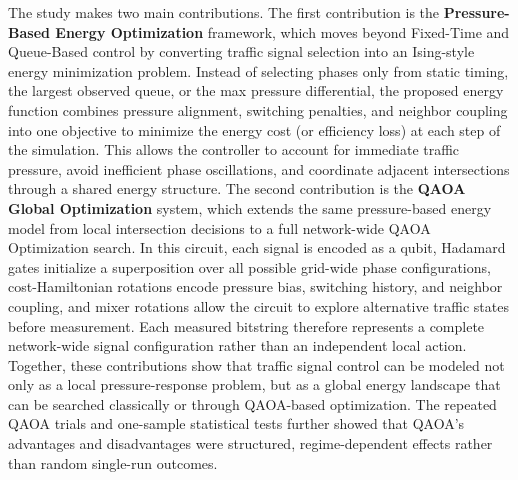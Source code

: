 \documentclass[12pt]{article}
\begin{document}
The study makes two main contributions. The first contribution is the \textbf{Pressure-Based Energy Optimization} framework, which moves beyond Fixed-Time and Queue-Based control by converting traffic signal selection into an Ising-style energy minimization problem. Instead of selecting phases only from static timing, the largest observed queue, or the max pressure differential, the proposed energy function combines pressure alignment, switching penalties, and neighbor coupling into one objective to minimize the energy cost (or efficiency loss) at each step of the simulation. This allows the controller to account for immediate traffic pressure, avoid inefficient phase oscillations, and coordinate adjacent intersections through a shared energy structure. The second contribution is the \textbf{QAOA Global Optimization} system, which extends the same pressure-based energy model from local intersection decisions to a full network-wide QAOA Optimization search. In this circuit, each signal is encoded as a qubit, Hadamard gates initialize a superposition over all possible grid-wide phase configurations, cost-Hamiltonian rotations encode pressure bias, switching history, and neighbor coupling, and mixer rotations allow the circuit to explore alternative traffic states before measurement. Each measured bitstring therefore represents a complete network-wide signal configuration rather than an independent local action. Together, these contributions show that traffic signal control can be modeled not only as a local pressure-response problem, but as a global energy landscape that can be searched classically or through QAOA-based optimization. The repeated QAOA trials and one-sample statistical tests further showed that QAOA's advantages and disadvantages were structured, regime-dependent effects rather than random single-run outcomes.
\end{document}
